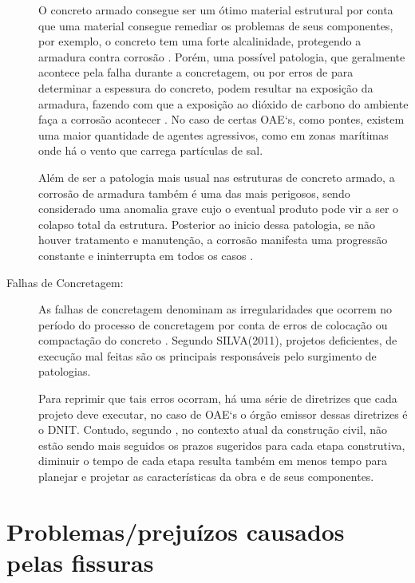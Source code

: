 \begin{description}
    O concreto armado consegue ser um ótimo material estrutural por conta que uma material consegue remediar os problemas de seus componentes, por exemplo, o concreto tem uma forte alcalinidade, protegendo a armadura contra corrosão \cite{pinheiro2010estruturas}.
    Porém, uma possível patologia, que geralmente acontece pela falha durante a concretagem, ou por erros de  para determinar a espessura do concreto, podem resultar na exposição da armadura, fazendo com que a exposição ao dióxido de carbono do ambiente faça a corrosão acontecer \cite{statera}. 
    No caso de certas OAE`s, como pontes, existem uma maior quantidade de agentes agressivos, como em zonas marítimas onde há o vento que carrega partículas de sal\cite{statera}.

    Além de ser a patologia mais usual nas estruturas de concreto armado, a corrosão de armadura também é uma das mais perigosos, sendo considerado uma anomalia grave cujo o eventual produto pode vir a ser o colapso total da estrutura\cite{tecnosil_2017}. 
    Posterior ao inicio dessa patologia, se não houver tratamento e manutenção, a corrosão manifesta uma progressão constante e ininterrupta em todos os casos \cite{tecnosil_2017}.
    
    \item[Falhas de Concretagem:]
    
    As falhas de concretagem denominam as irregularidades que ocorrem no período do processo de concretagem por conta de erros de colocação ou compactação do concreto \cite{statera}.
    Segundo SILVA(2011), projetos deficientes, de execução mal feitas são os principais responsáveis pelo surgimento de patologias.
    
    Para reprimir que tais erros ocorram, há uma série de diretrizes que cada projeto deve executar, no caso de OAE`s o órgão emissor dessas diretrizes é o DNIT. 
    Contudo, segundo , no contexto atual da construção civil, não estão sendo mais seguidos os prazos sugeridos para cada etapa construtiva, diminuir o tempo de cada etapa resulta também em menos tempo para planejar e projetar as características da obra e de seus componentes.

    
\end{description}


\section{Problemas/prejuízos causados pelas fissuras}

